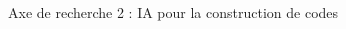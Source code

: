 \documentclass[t,compress,mathserif,12pt,xcolor=dvipsnames]{beamer}
\begin{document}
\begin{frame}[t]{Axe de recherche 2 : IA pour la construction de codes}
  \begin{minipage}[t][5.0cm][t]{\textwidth}
    \begin{columns}[T]
      \begin{column}{0.45\textwidth}
        \vspace*{-1.1cm}
        \begin{center}
        \end{center}
      

\end{column}
\end{columns}
\end{minipage}
\end{frame}
\end{document}
